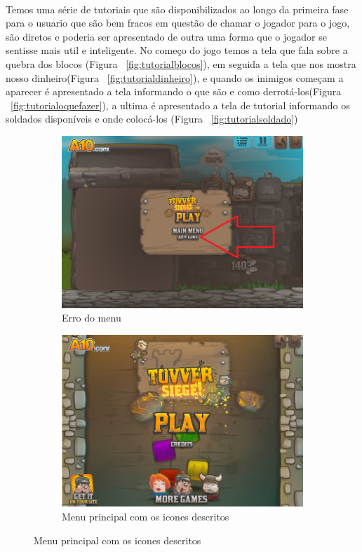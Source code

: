 \documentclass[12pt]{article}
\begin{document}
\paragraph{} Temos uma série de tutoriais que são disponibilizados ao longo da primeira fase para o usuario que são bem fracos em questão de chamar o jogador para o jogo, são diretos e poderia ser apresentado de outra uma forma que o jogador se sentisse mais util e inteligente. No começo do jogo temos a tela que fala sobre a quebra dos blocos (Figura ~\ref{fig:tutorialblocos}), em seguida a tela que nos mostra nosso dinheiro(Figura ~\ref{fig:tutorialdinheiro}), e quando os inimigos começam a aparecer é apresentado a tela informando o que são e como derrotá-los(Figura ~\ref{fig:tutorialoquefazer}), a ultima é apresentado a tela de tutorial informando os soldados disponíveis e onde colocá-los (Figura ~\ref{fig:tutorialsoldado})

\begin{figure}[h]
\begin{subfigure}{0.5\textwidth}
\includegraphics[scale=0.3]{imagens/menuerro.png}
\caption{Erro do menu}
\label{fig:menuerro}
\end{subfigure}
\begin{subfigure}{0.5\textwidth}
\includegraphics[scale=0.3]{imagens/menuprincipal.png} 
\caption{Menu principal com os icones descritos}
\label{fig:menuprincipal}
\end{subfigure}
\end{figure}
\end{document}
